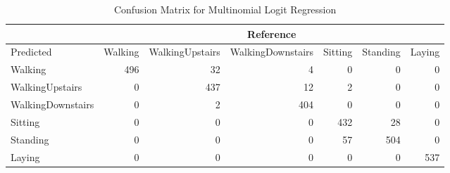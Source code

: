 \begin{table}[ht]
\begin{adjustwidth}{-1in}{-1in}
\centering
\caption{Confusion Matrix for Multinomial Logit Regression} 
\label{tab:conmat_dmr}
\begin{tabular}{l|rrrrrr}
  &\multicolumn{6}{c}{Reference}\\
 \hline
Predicted & Walking & WalkingUpstairs & WalkingDownstairs & Sitting & Standing & Laying \\ 
  \hline
Walking & 496 &  32 &   4 &   0 &   0 &   0 \\ 
  WalkingUpstairs &   0 & 437 &  12 &   2 &   0 &   0 \\ 
  WalkingDownstairs &   0 &   2 & 404 &   0 &   0 &   0 \\ 
  Sitting &   0 &   0 &   0 & 432 &  28 &   0 \\ 
  Standing &   0 &   0 &   0 &  57 & 504 &   0 \\ 
  Laying &   0 &   0 &   0 &   0 &   0 & 537 \\ 
   \hline
\end{tabular}
\end{adjustwidth}
\end{table}

